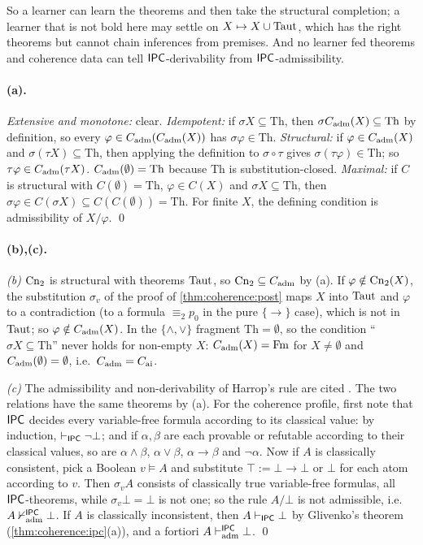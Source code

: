 So a learner can learn the theorems and then take the structural completion; a learner that is not bold here may settle on $X\mapsto X\cup\mathrm{Taut}$, which has the right theorems but cannot chain inferences from premises. And no learner fed theorems and coherence data can tell $\mathsf{IPC}$-derivability from $\mathsf{IPC}$-admissibility.

\paragraph{(a).} \emph{Extensive and monotone:} clear. \emph{Idempotent:} if $\sigma X\subseteq\mathrm{Th}$, then $\sigma C_{\mathrm{adm}}(X)\subseteq\mathrm{Th}$ by definition, so every $\varphi\in C_{\mathrm{adm}}(C_{\mathrm{adm}}(X))$ has $\sigma\varphi\in\mathrm{Th}$. \emph{Structural:} if $\varphi\in C_{\mathrm{adm}}(X)$ and $\sigma(\tau X)\subseteq\mathrm{Th}$, then applying the definition to $\sigma\circ\tau$ gives $\sigma(\tau\varphi)\in\mathrm{Th}$; so $\tau\varphi\in C_{\mathrm{adm}}(\tau X)$. $C_{\mathrm{adm}}(\emptyset)=\mathrm{Th}$ because $\mathrm{Th}$ is substitution-closed. \emph{Maximal:} if $C$ is structural with $C(\emptyset)=\mathrm{Th}$, $\varphi\in C(X)$ and $\sigma X\subseteq\mathrm{Th}$, then $\sigma\varphi\in C(\sigma X)\subseteq C(C(\emptyset))=\mathrm{Th}$. For finite $X$, the defining condition is admissibility of $X/\varphi$. \qed

\paragraph{(b),(c).} \emph{(b)} $\mathrm{Cn}_2$ is structural with theorems $\mathrm{Taut}$, so $\mathrm{Cn}_2\subseteq C_{\mathrm{adm}}$ by (a). If $\varphi\notin\mathrm{Cn}_2(X)$, the substitution $\sigma_v$ of the proof of \cref{thm:coherence:post} maps $X$ into $\mathrm{Taut}$ and $\varphi$ to a contradiction (to a formula $\equiv_2p_0$ in the pure $\{\to\}$ case), which is not in $\mathrm{Taut}$; so $\varphi\notin C_{\mathrm{adm}}(X)$. In the $\{\wedge,\vee\}$ fragment $\mathrm{Th}=\emptyset$, so the condition ``$\sigma X\subseteq\mathrm{Th}$'' never holds for non-empty $X$: $C_{\mathrm{adm}}(X)=\mathrm{Fm}$ for $X\neq\emptyset$ and $C_{\mathrm{adm}}(\emptyset)=\emptyset$, i.e.\ $C_{\mathrm{adm}}=C_{\mathrm{ai}}$.

\emph{(c)} The admissibility and non-derivability of Harrop's rule are cited \citep{harrop1960concerning,rybakov1997admissibility,iemhoff2001admissible}. The two relations have the same theorems by (a). For the coherence profile, first note that $\mathsf{IPC}$ decides every variable-free formula according to its classical value: by induction, $\vdash_{\mathsf{IPC}}\neg\bot$; and if $\alpha,\beta$ are each provable or refutable according to their classical values, so are $\alpha\wedge\beta$, $\alpha\vee\beta$, $\alpha\to\beta$ and $\neg\alpha$. Now if $A$ is classically consistent, pick a Boolean $v\models A$ and substitute $\top:=\bot\to\bot$ or $\bot$ for each atom according to $v$. Then $\sigma_vA$ consists of classically true variable-free formulas, all $\mathsf{IPC}$-theorems, while $\sigma_v\bot=\bot$ is not one; so the rule $A/\bot$ is not admissible, i.e.\ $A\nvdash^{\mathsf{IPC}}_{\mathrm{adm}}\bot$. If $A$ is classically inconsistent, then $A\vdash_{\mathsf{IPC}}\bot$ by Glivenko's theorem (\cref{thm:coherence:ipc}(a)), and a fortiori $A\vdash^{\mathsf{IPC}}_{\mathrm{adm}}\bot$. \qed

